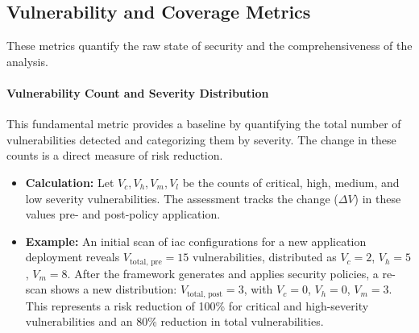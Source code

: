 \subsection*{Vulnerability and Coverage Metrics}
These metrics quantify the raw state of security and the comprehensiveness of the analysis.

\paragraph{Vulnerability Count and Severity Distribution} This fundamental metric provides a baseline by quantifying the total number of vulnerabilities detected and categorizing them by severity. The change in these counts is a direct measure of risk reduction.
\begin{itemize}
    \item \textbf{Calculation:} Let \( V_c, V_h, V_m, V_l \) be the counts of critical, high, medium, and low severity vulnerabilities. The assessment tracks the change (\( \Delta V \)) in these values pre- and post-policy application.
    \item \textbf{Example:} An initial scan of \gls{iac} configurations for a new application deployment reveals \( V_{\text{total, pre}} = 15 \) vulnerabilities, distributed as \( V_c = 2 \), \( V_h = 5 \), \( V_m = 8 \). After the framework generates and applies security policies, a re-scan shows a new distribution: \( V_{\text{total, post}} = 3 \), with \( V_c = 0 \), \( V_h = 0 \), \( V_m = 3 \). This represents a risk reduction of 100\% for critical and high-severity vulnerabilities and an 80\% reduction in total vulnerabilities.
\end{itemize}

